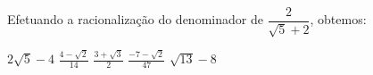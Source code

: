 Efetuando a racionalização do denominador de $\dfrac{2}{\sqrt{5}+2}$, obtemos:

$2\sqrt{5}-4$
$\frac{4-\sqrt{2}}{14}$
$\frac{3+\sqrt{3}}{2}$
$\frac{-7-\sqrt{2}}{47}$
$\sqrt{13}-8$

